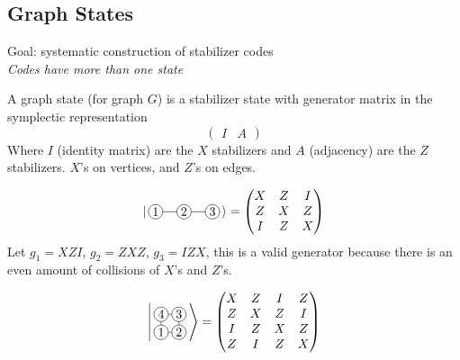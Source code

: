 \subsection{Graph States}
Goal: systematic construction of stabilizer codes\\
\textit{Codes have more than one state}
\begin{definition}
    A graph state (for graph $G$) is a stabilizer state with generator matrix in the symplectic representation
    \begin{equation}
        \left(\begin{array}{c|c} I & A \end{array}\right)
    \end{equation}
    Where $I$ (identity matrix) are the $X$ stabilizers and $A$ (adjacency) are the $Z$ stabilizers. $X$'s on vertices, and $Z$'s on edges.
\end{definition}
\begin{example}
    \begin{equation}
        \ket{\,%
\begin{tikzpicture}[baseline=-0.6ex]
  \node[circle,draw,inner sep=1.2pt] (v1) at (0,0) {$1$};
  \node[circle,draw,inner sep=1.2pt] (v2) at (0.8,0) {$2$};
  \node[circle,draw,inner sep=1.2pt] (v3) at (1.6,0) {$3$};
  \draw (v1) -- (v2) -- (v3);
\end{tikzpicture}
\,} = \begin{pmatrix}
         X & Z & I \\
         Z & X & Z \\ 
         I & Z & X
     \end{pmatrix}
    \end{equation}
     Let $g_1 = XZI$, $g_2 = ZXZ$, $g_3=IZX$, this is a valid generator because there is an even amount of collisions of $X$'s and $Z$'s. 
\end{example}
\begin{example}
    \begin{equation}
        \Bigg|\,%
\begin{tikzpicture}[baseline=1.3ex, scale=0.5]
  \node[circle,draw,inner sep=1.2pt] (v1) at (0,0) {$1$};
  \node[circle,draw,inner sep=1.2pt] (v2) at (1,0) {$2$};
  \node[circle,draw,inner sep=1.2pt] (v3) at (1,1) {$3$};
  \node[circle,draw,inner sep=1.2pt] (v4) at (0,1) {$4$};
  \draw (v1)--(v2)--(v3)--(v4)--(v1);
\end{tikzpicture}
\, \Bigg\rangle = \begin{pmatrix}
    X & Z& I& Z\\
     Z& X & Z& I\\
     I& Z & X & Z\\
     Z& I & Z & X
\end{pmatrix}
\end{equation}
\end{example}

